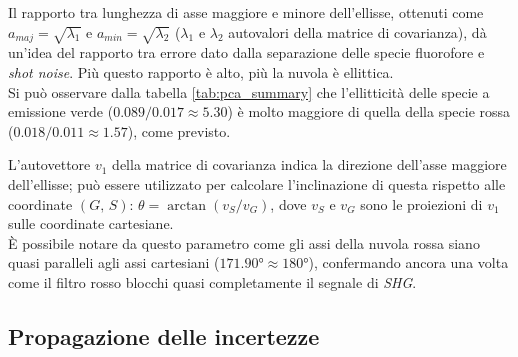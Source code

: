 
\noindent Il rapporto tra lunghezza di asse maggiore e minore dell'ellisse, ottenuti come $a_{maj} = \sqrt{\lambda_1}$ e $a_{min} = \sqrt{\lambda_2}$ ($\lambda_1$ e $\lambda_2$ autovalori della matrice di covarianza), dà un'idea del rapporto tra errore dato dalla separazione delle specie fluorofore e \textit{shot noise}. Più questo rapporto è alto, più la nuvola è ellittica.\\
Si può osservare dalla tabella \ref{tab:pca_summary} che l'ellitticità delle specie a emissione verde ($0.089/0.017 \approx 5.30$) è molto maggiore di quella della specie rossa ($0.018/0.011\approx 1.57$), come previsto.

L'autovettore $v_1$ della matrice di covarianza indica la direzione dell'asse maggiore dell'ellisse; può essere utilizzato per calcolare l'inclinazione di questa rispetto alle coordinate $(G,\, S)$: $\theta = \arctan(v_S / v_G)$, dove $v_S$ e $v_G$ sono le proiezioni di $v_1$ sulle coordinate cartesiane.\\
È possibile notare da questo parametro come gli assi della nuvola rossa siano quasi paralleli agli assi cartesiani ($171.90°\approx180°$), confermando ancora una volta come il filtro rosso blocchi quasi completamente il segnale di \textit{SHG}.



\subsection{Propagazione delle incertezze}


